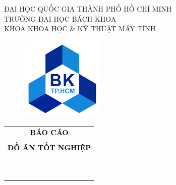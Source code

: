 \documentclass[a4paper]{report}
\begin{document}
\begin{titlepage}
	\begin{center}
		ĐẠI HỌC QUỐC GIA THÀNH PHỐ HỒ CHÍ MINH \\
		TRƯỜNG ĐẠI HỌC BÁCH KHOA \\
		KHOA KHOA HỌC \& KỸ THUẬT MÁY TÍNH
	\end{center}
	\renewcommand{\rmdefault}{ppl}
	\vspace{1cm}
	\begin{figure}[h!]
		\begin{center}
			\includegraphics[width=4cm, height=4cm]{Pictures/logoBK.png}
		\end{center}
	\end{figure}
	\vspace{1cm}

	\begin{center}
		\begin{tabular}{c}
			\textbf{\large\textcolor{black}{BÁO CÁO}}                                    \\\\
			\textbf{\large\textcolor{black}{ĐỒ ÁN TỐT NGHIỆP}}                           \\\\
			~~                                                                           \\
			\hline
			\\
			\textbf{\large \color{black}{Phát triển và mở rộng}}                         \\
			\textbf{\large \color{black}{nền tảng đánh giá quy trình nghiệp vụ tự động}} \\
			\\
			\hline
		\end{tabular}
	\end{center}
	\vspace{2cm}


\end{titlepage}
\end{document}
